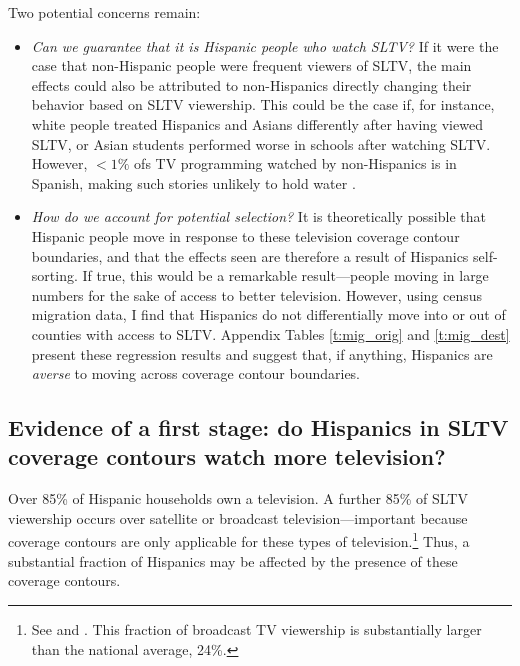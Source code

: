 \documentclass[11pt]{article}
\begin{document}
Two potential concerns remain:
\begin{itemize}
\item \textit{Can we guarantee that it is Hispanic people who watch SLTV?} If it were the case that non-Hispanic people were frequent viewers of SLTV, the main effects could also be attributed to non-Hispanics directly changing their behavior based on SLTV viewership. This could be the case if, for instance, white people treated Hispanics and Asians differently after having viewed SLTV, or Asian students performed worse in schools after watching SLTV. However,  $<1\%$ ofs TV programming watched by non-Hispanics is in Spanish, making such stories unlikely to hold water \citep{noauthor_hispanic_2016}.

\item \textit{How do we account for potential selection?} It is theoretically possible that Hispanic people move in response to these television coverage contour boundaries, and that the effects seen are therefore a result of Hispanics self-sorting. If true, this would be a remarkable result---people moving in large numbers for the sake of access to better television. However, using census migration data, I find that Hispanics do not differentially move into or out of counties with access to SLTV. Appendix Tables \ref{t:mig_orig} and \ref{t:mig_dest} present these regression results and suggest that, if anything, Hispanics are \textit{averse} to moving across coverage contour boundaries.



\end{itemize}




\subsection{Evidence of a first stage: do Hispanics in SLTV coverage contours watch more television?}

Over 85\% of Hispanic households own a television. A further 85\% of SLTV viewership occurs over satellite or broadcast television---important because coverage contours are only applicable for these types of television.\footnote{ See \cite{noauthor_hispanic_2016} and \cite{de_la_merced_att_2014}. This fraction of broadcast TV viewership is substantially larger than the national average, 24\%.} Thus, a substantial fraction of Hispanics may be affected by the presence of these coverage contours.
\end{document}
